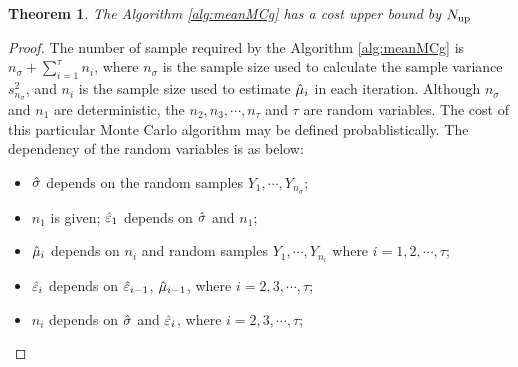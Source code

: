 \documentclass{iitthesis}
\newtheorem{theorem}{Theorem}[section]
\theoremstyle{definition}
\begin{document}
\begin{theorem}
The Algorithm \ref{alg:meanMCg} has a cost upper bound by $N_{\operatorname{up}}$
\end{theorem}
\begin{proof}
The number of sample required by the Algorithm \ref{alg:meanMCg} is $n_{\sigma}+\sum_{i=1}^\tau n_i$, where $n_\sigma$ is the sample size used to calculate the sample variance $s_{n_\sigma}^2$, and $n_i$ is the sample size used to estimate $\hat{\mu}_i$ in each iteration.
 Although $n_{\sigma}$ and $n_1$ are deterministic, the $n_2, n_3,\cdots, n_\tau$ and $\tau$ are random variables. The cost of this particular Monte Carlo algorithm may be defined probablistically. The dependency of the random variables is as below:
 \begin{itemize}
 \item $\hat{\sigma}$ depends on the random samples $Y_1,\cdots, Y_{n_\sigma}$;
 \item $n_1$ is given; $\hat{\varepsilon}_1$ depends on $\hat{\sigma}$ and $n_1$; 
  \item $\hat{\mu}_i$ depends on $n_i$ and random samples $Y_1, \cdots, Y_{n_i}$ where $i = 1,2,\cdots,\tau$;
 \item $\hat{\varepsilon}_i$ depends on $\hat{\varepsilon}_{i-1}$, $\hat{\mu}_{i-1}$, where $i = 2,3,\cdots,\tau$;
 \item $n_i$ depends on  $\hat{\sigma}$ and $\hat{\varepsilon}_i$, where  $i = 2,3,\cdots,\tau$;
 \end{itemize}
 

\end{proof}
\end{document}
